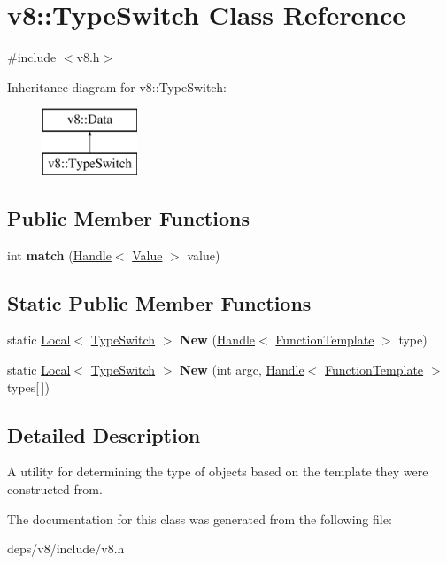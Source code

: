 \hypertarget{classv8_1_1_type_switch}{}\section{v8\+:\+:Type\+Switch Class Reference}
\label{classv8_1_1_type_switch}


{\ttfamily \#include $<$v8.\+h$>$}

Inheritance diagram for v8\+:\+:Type\+Switch\+:\begin{figure}[H]
\begin{center}
\leavevmode
\includegraphics[height=2.000000cm]{classv8_1_1_type_switch}
\end{center}
\end{figure}
\subsection*{Public Member Functions}
\begin{DoxyCompactItemize}
\item 
\hypertarget{classv8_1_1_type_switch_a678fe45db1e97ba46df7359b51752483}{}int {\bfseries match} (\hyperlink{classv8_1_1_handle}{Handle}$<$ \hyperlink{classv8_1_1_value}{Value} $>$ value)\label{classv8_1_1_type_switch_a678fe45db1e97ba46df7359b51752483}

\end{DoxyCompactItemize}
\subsection*{Static Public Member Functions}
\begin{DoxyCompactItemize}
\item 
\hypertarget{classv8_1_1_type_switch_ac94aac0b1ba0bde763bc8b6ae6aea532}{}static \hyperlink{classv8_1_1_local}{Local}$<$ \hyperlink{classv8_1_1_type_switch}{Type\+Switch} $>$ {\bfseries New} (\hyperlink{classv8_1_1_handle}{Handle}$<$ \hyperlink{classv8_1_1_function_template}{Function\+Template} $>$ type)\label{classv8_1_1_type_switch_ac94aac0b1ba0bde763bc8b6ae6aea532}

\item 
\hypertarget{classv8_1_1_type_switch_a47003915e553a7ca2285b8a0bf42993b}{}static \hyperlink{classv8_1_1_local}{Local}$<$ \hyperlink{classv8_1_1_type_switch}{Type\+Switch} $>$ {\bfseries New} (int argc, \hyperlink{classv8_1_1_handle}{Handle}$<$ \hyperlink{classv8_1_1_function_template}{Function\+Template} $>$ types\mbox{[}$\,$\mbox{]})\label{classv8_1_1_type_switch_a47003915e553a7ca2285b8a0bf42993b}

\end{DoxyCompactItemize}


\subsection{Detailed Description}
A utility for determining the type of objects based on the template they were constructed from. 

The documentation for this class was generated from the following file\+:\begin{DoxyCompactItemize}
\item 
deps/v8/include/v8.\+h\end{DoxyCompactItemize}

